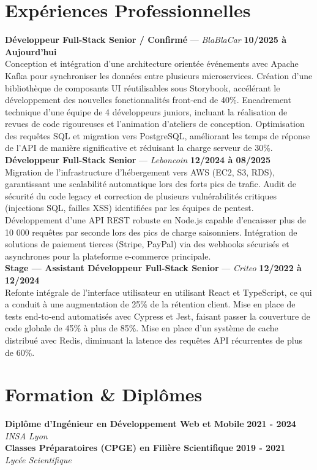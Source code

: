 \documentclass[11pt,a4paper]{article}
\begin{document}
\section*{Expériences Professionnelles}
\noindent \textbf{Développeur Full-Stack Senior / Confirmé} --- \textit{BlaBlaCar} \hfill \textbf{10/2025 à Aujourd'hui} \\
Conception et intégration d'une architecture orientée événements avec Apache Kafka pour synchroniser les données entre plusieurs microservices. Création d'une bibliothèque de composants UI réutilisables sous Storybook, accélérant le développement des nouvelles fonctionnalités front-end de 40\%. Encadrement technique d'une équipe de 4 développeurs juniors, incluant la réalisation de revues de code rigoureuses et l'animation d'ateliers de conception. Optimisation des requêtes SQL et migration vers PostgreSQL, améliorant les temps de réponse de l'API de manière significative et réduisant la charge serveur de 30\%. \\[0.3cm]
\noindent \textbf{Développeur Full-Stack Senior} --- \textit{Leboncoin} \hfill \textbf{12/2024 à 08/2025} \\
Migration de l'infrastructure d'hébergement vers AWS (EC2, S3, RDS), garantissant une scalabilité automatique lors des forts pics de trafic. Audit de sécurité du code legacy et correction de plusieurs vulnérabilités critiques (injections SQL, failles XSS) identifiées par les équipes de pentest. Développement d'une API REST robuste en Node.js capable d'encaisser plus de 10 000 requêtes par seconde lors des pics de charge saisonniers. Intégration de solutions de paiement tierces (Stripe, PayPal) via des webhooks sécurisés et asynchrones pour la plateforme e-commerce principale. \\[0.3cm]
\noindent \textbf{Stage — Assistant Développeur Full-Stack Senior} --- \textit{Criteo} \hfill \textbf{12/2022 à 12/2024} \\
Refonte intégrale de l'interface utilisateur en utilisant React et TypeScript, ce qui a conduit à une augmentation de 25\% de la rétention client. Mise en place de tests end-to-end automatisés avec Cypress et Jest, faisant passer la couverture de code globale de 45\% à plus de 85\%. Mise en place d'un système de cache distribué avec Redis, diminuant la latence des requêtes API récurrentes de plus de 60\%. \\[0.3cm]


\vspace{0.3cm}

\section*{Formation \& Diplômes}
\noindent \textbf{Diplôme d'Ingénieur en Développement Web et Mobile} \hfill \textbf{2021 - 2024} \\
\textit{INSA Lyon} \\[0.3cm]
\noindent \textbf{Classes Préparatoires (CPGE) en Filière Scientifique} \hfill \textbf{2019 - 2021} \\
\textit{Lycée Scientifique} \\[0.3cm]
\end{document}
